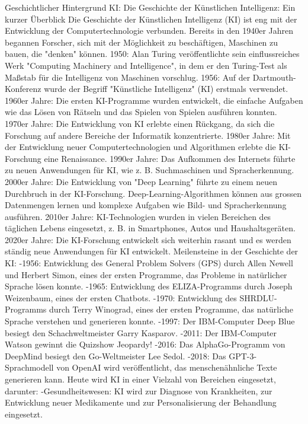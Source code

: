 \documentclass{article}
\begin{document}
{    Geschichtlicher Hintergrund KI:
    Die Geschichte der Künstlichen Intelligenz: Ein kurzer Überblick
    Die Geschichte der Künstlichen Intelligenz (KI) ist eng mit der Entwicklung der Computertechnologie verbunden. Bereits in den 1940er Jahren begannen Forscher, sich mit der Möglichkeit zu beschäftigen, Maschinen zu bauen, die "denken" können.
    1950: Alan Turing veröffentlichte sein einflussreiches Werk "Computing Machinery and Intelligence", in dem er den Turing-Test als Maßstab für die Intelligenz von Maschinen vorschlug.
    1956: Auf der Dartmouth-Konferenz wurde der Begriff "Künstliche Intelligenz" (KI) erstmals verwendet.
    1960er Jahre: Die ersten KI-Programme wurden entwickelt, die einfache Aufgaben wie das Lösen von Rätseln und das Spielen von Spielen ausführen konnten.
    1970er Jahre: Die Entwicklung von KI erlebte einen Rückgang, da sich die Forschung auf andere Bereiche der Informatik konzentrierte.
    1980er Jahre: Mit der Entwicklung neuer Computertechnologien und Algorithmen erlebte die KI-Forschung eine Renaissance.
    1990er Jahre: Das Aufkommen des Internets führte zu neuen Anwendungen für KI, wie z. B. Suchmaschinen und Spracherkennung.
    2000er Jahre: Die Entwicklung von "Deep Learning" führte zu einem neuen Durchbruch in der KI-Forschung. Deep-Learning-Algorithmen können aus grossen Datenmengen lernen und komplexe Aufgaben wie Bild- und Spracherkennung ausführen.
    2010er Jahre: KI-Technologien wurden in vielen Bereichen des täglichen Lebens eingesetzt, z. B. in Smartphones, Autos und Haushaltsgeräten.
    2020er Jahre: Die KI-Forschung entwickelt sich weiterhin rasant und es werden ständig neue Anwendungen für KI entwickelt.
    Meilensteine in der Geschichte der KI:
    -1956: Entwicklung des General Problem Solvers (GPS) durch Allen Newell und Herbert Simon, eines der ersten Programme, das Probleme in natürlicher Sprache lösen konnte.
    -1965: Entwicklung des ELIZA-Programms durch Joseph Weizenbaum, eines der ersten Chatbots.
    -1970: Entwicklung des SHRDLU-Programms durch Terry Winograd, eines der ersten Programme, das natürliche Sprache verstehen und generieren konnte.
    -1997: Der IBM-Computer Deep Blue besiegt den Schachweltmeister Garry Kasparov.
    -2011: Der IBM-Computer Watson gewinnt die Quizshow Jeopardy!
    -2016: Das AlphaGo-Programm von DeepMind besiegt den Go-Weltmeister Lee Sedol.
    -2018: Das GPT-3-Sprachmodell von OpenAI wird veröffentlicht, das menschenähnliche Texte generieren kann.
    Heute wird KI in einer Vielzahl von Bereichen eingesetzt, darunter:
    -Gesundheitswesen: KI wird zur Diagnose von Krankheiten, zur Entwicklung neuer Medikamente und zur Personalisierung der Behandlung eingesetzt.
}
\end{document}
